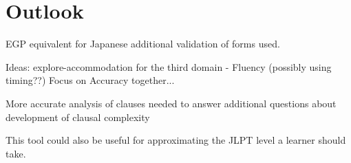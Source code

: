 \chapter{Outlook}
%
EGP equivalent for Japanese additional validation of forms used.

Ideas: explore-accommodation for the third domain - Fluency (possibly using timing??)  Focus on Accuracy together...

More accurate analysis of clauses needed to answer additional questions about development of clausal complexity

This tool could also be useful for approximating the JLPT level a learner should take.